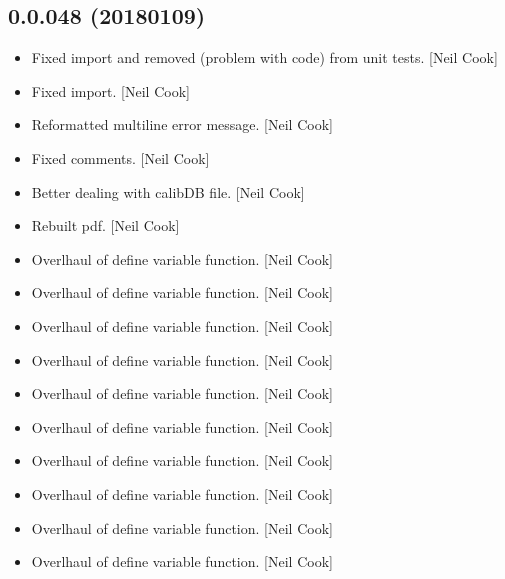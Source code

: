 \documentclass[a4paper,10pt,english]{report}
\begin{document}
\subsection{0.0.048 (2018\sphinxhyphen{}01\sphinxhyphen{}09)}
\label{\detokenize{misc/changelog:id523}}\begin{itemize}
\item {} 
Fixed import and removed  (problem with code) from unit tests.
{[}Neil Cook{]}

\item {} 
Fixed import. {[}Neil Cook{]}

\item {} 
Reformatted multi\sphinxhyphen{}line error message. {[}Neil Cook{]}

\item {} 
Fixed comments. {[}Neil Cook{]}

\item {} 
Better dealing with calibDB file. {[}Neil Cook{]}

\item {} 
Rebuilt pdf. {[}Neil Cook{]}

\item {} 
Overlhaul of define variable function. {[}Neil Cook{]}

\item {} 
Overlhaul of define variable function. {[}Neil Cook{]}

\item {} 
Overlhaul of define variable function. {[}Neil Cook{]}

\item {} 
Overlhaul of define variable function. {[}Neil Cook{]}

\item {} 
Overlhaul of define variable function. {[}Neil Cook{]}

\item {} 
Overlhaul of define variable function. {[}Neil Cook{]}

\item {} 
Overlhaul of define variable function. {[}Neil Cook{]}

\item {} 
Overlhaul of define variable function. {[}Neil Cook{]}

\item {} 
Overlhaul of define variable function. {[}Neil Cook{]}

\item {} 
Overlhaul of define variable function. {[}Neil Cook{]}


\end{itemize}
\end{document}

